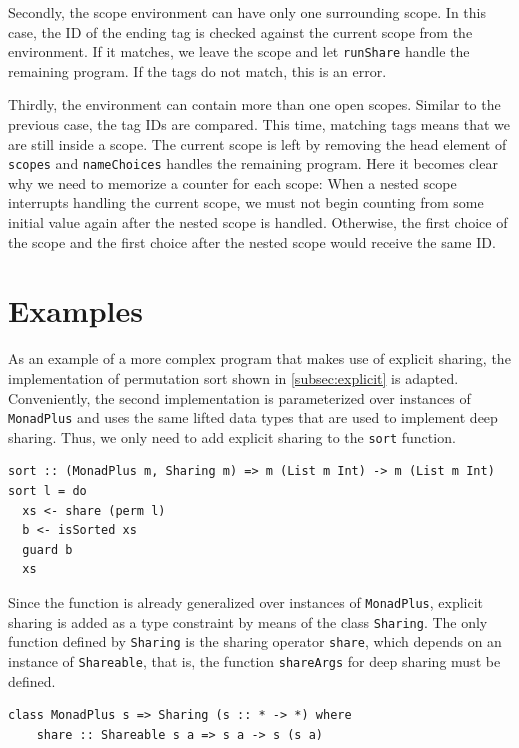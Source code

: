 \documentclass[a4paper, 11pt, fleqn, twoside]{scrreprt}
\newcommand{\hinl}[1]{\texttt{#1}}
\begin{document}
Secondly, the scope environment can have only one surrounding scope.
In this case, the ID of the ending tag is checked against the current scope from the environment.
If it matches, we leave the scope and let \hinl{runShare} handle the remaining program.
If the tags do not match, this is an error.

Thirdly, the environment can contain more than one open scopes.
Similar to the previous case, the tag IDs are compared.
This time, matching tags means that we are still inside a scope.
The current scope is left by removing the head element of \hinl{scopes} and \hinl{nameChoices} handles the remaining program.
Here it becomes clear why we need to memorize a counter for each scope: When a nested scope interrupts handling the current scope, we must not begin counting from some initial value again after the nested scope is handled.
Otherwise, the first choice of the scope and the first choice after the nested scope would receive the same ID.

\section{Examples}

As an example of a more complex program that makes use of explicit sharing, the implementation of permutation sort shown in \autoref{subsec:explicit} is adapted.
Conveniently, the second implementation is parameterized over instances of \hinl{MonadPlus} and uses the same lifted data types that are used to implement deep sharing.
Thus, we only need to add explicit sharing to the \hinl{sort} function.

\begin{verbatim}
sort :: (MonadPlus m, Sharing m) => m (List m Int) -> m (List m Int)
sort l = do
  xs <- share (perm l)
  b <- isSorted xs
  guard b
  xs
\end{verbatim}

Since the function is already generalized over instances of \hinl{MonadPlus}, explicit sharing is added as a type constraint by means of the class \hinl{Sharing}.
The only function defined by \hinl{Sharing} is the sharing operator \hinl{share}, which depends on an instance of \hinl{Shareable}, that is, the function \hinl{shareArgs} for deep sharing must be defined.

\begin{verbatim}
class MonadPlus s => Sharing (s :: * -> *) where
    share :: Shareable s a => s a -> s (s a)
\end{verbatim}
\end{document}
